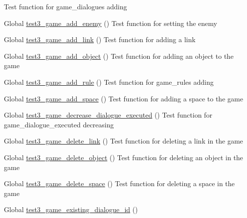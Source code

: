\begin{DoxyRefList}
%
Test function for game\+\_\+dialogues adding  
\item[Global \mbox{\hyperlink{game__test_8c_a244cb44b1d2ca1cd9760d4d86e7c67d0}{test3\+\_\+game\+\_\+add\+\_\+enemy}} ()]\label{test__test000178}%
%
Test function for setting the enemy  
\item[Global \mbox{\hyperlink{game__test_8c_af97f3fbab50d8122acc5b2632c9a27cb}{test3\+\_\+game\+\_\+add\+\_\+link}} ()]\label{test__test000226}%
%
Test function for adding a link  
\item[Global \mbox{\hyperlink{game__test_8c_ac6b7f7180414f14b0ca9629999da9f75}{test3\+\_\+game\+\_\+add\+\_\+object}} ()]\label{test__test000189}%
%
Test function for adding an object to the game  
\item[Global \mbox{\hyperlink{game__test_8c_a4ca56342e06b0ac5196051ad214a1c04}{test3\+\_\+game\+\_\+add\+\_\+rule}} ()]\label{test__test000410}%
%
Test function for game\+\_\+rules adding  
\item[Global \mbox{\hyperlink{game__test_8c_a7d77ce55d38ea58e076f160dc0ea019c}{test3\+\_\+game\+\_\+add\+\_\+space}} ()]\label{test__test000214}%
%
Test function for adding a space to the game  
\item[Global \mbox{\hyperlink{game__test_8c_a70a1ba6418c48715a39c03c2f7faaf4a}{test3\+\_\+game\+\_\+decrease\+\_\+dialogue\+\_\+executed}} ()]\label{test__test000309}%
%
Test function for game\+\_\+dialogue\+\_\+executed decreasing  
\item[Global \mbox{\hyperlink{game__test_8c_aa2c8e9083d33c5e5b761fca8c9ca8781}{test3\+\_\+game\+\_\+delete\+\_\+link}} ()]\label{test__test000229}%
%
Test function for deleting a link in the game  
\item[Global \mbox{\hyperlink{game__test_8c_a0055722e80875afd41556cb6594c5aca}{test3\+\_\+game\+\_\+delete\+\_\+object}} ()]\label{test__test000192}%
%
Test function for deleting an object in the game  
\item[Global \mbox{\hyperlink{game__test_8c_ae9b094e684b8ed210ae0fa4bd0e2236b}{test3\+\_\+game\+\_\+delete\+\_\+space}} ()]\label{test__test000217}%
%
Test function for deleting a space in the game  
\item[Global \mbox{\hyperlink{game__test_8c_a1d5bee10984efedd185fdba1719ca5ba}{test3\+\_\+game\+\_\+existing\+\_\+dialogue\+\_\+id}} ()]\label{test__test000288}%

\end{DoxyRefList}
